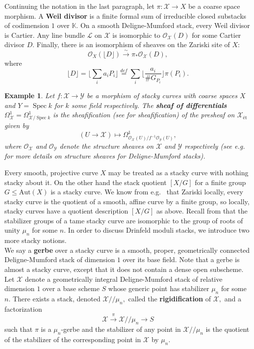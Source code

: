 \documentclass[11pt]{amsart}
\newtheorem{example}[theorem]{Example}
\theoremstyle{definition}
\numberwithin{equation}{section}
\newcommand{\Aut}{\mathrm{Aut}} 	%
\newcommand{\Spec}{\operatorname{Spec}} 	%
\newcommand{\cO}{\mathcal{O}}		%
\newcommand{\sL}{\mathscr{L}}		%
\newcommand{\sX}{\mathscr{X}}		%
\newcommand{\sY}{\mathscr{Y}}		%
\newcommand{\bbK}{\mathbb{K}}		%
\begin{document}
		Continuing the notation in the last paragraph, let $\pi:\sX\to X$ be a coarse space morphism. A \textbf{Weil divisor} is a finite formal sum of irreducible closed substacks of codimension $1$ over $\bbK.$ On a smooth Deligne-Mumford stack, every Weil divisor is Cartier. Any line bundle $\sL$ on $\sX$ is isomorphic to $\cO_{\sX}(D)$ for some Cartier divisor $D.$ Finally, there is an isomorphism of sheaves on the Zariski site of $X:$
		\[ \cO_X(\lfloor D \rfloor)\overset{\sim}{\to}\pi_*\cO_{\sX}(D), \]
		where \[\lfloor D\rfloor=\Big\lfloor\sum_ia_iP_i\Big\rfloor\overset{def}{=}\sum_i\Big\lfloor\frac{a_i}{\#G_{P_i}}\Big\rfloor\pi(P_i).\]
		
		\begin{example}\label{ex: sheaf of differentials}
			Let $f:\sX\to \sY$ be a morphism of stacky curves with coarse spaces $X$ and $Y=\Spec k$ for $k$ some field respectively. The \textbf{sheaf of differentials} $\Omega^1_{\sX}=\Omega^1_{\sX/\Spec k}$ is the sheafification (see \cite[Section $2.2.9$]{Alper-Stacks-and-Moduli} for sheafification) of the presheaf on $\sX_{\text{\'et}}$ given by 
			\[ (U\to \sX)\mapsto \Omega^1_{\cO_{\sX}(U)/f^{-1}\cO_{\sY}(U)},\]
			where $\cO_{\sX}$ and $\cO_{\sY}$ denote the structure sheaves on $\sX$ and $\sY$ respectively (see e.g.\ \cite[Example $4.1.2$]{Alper-Stacks-and-Moduli} for more details on structure sheaves for Deligne-Mumford stacks). 
		\end{example}
		
		Every smooth, projective curve $X$ may be treated as a stacky curve with nothing stacky about it. On the other hand the stack quotient $[X/G]$ for a finite group $G\leq \Aut(X)$ is a stacky curve. We know from e.g.\ \cite[Remark $5.2.8$]{VZB} that Zariski locally, every stacky curve is the quotient of a smooth, affine curve by a finite group, so locally, stacky curves have a quotient description $[X/G]$ as above. Recall from \cite[Lemma $5.3.10.(b)$]{VZB} that the stabilizer groups of a tame stacky curve are isomorphic to the group of roots of unity $\mu_n$ for some $n.$ In order to discuss Drinfeld moduli stacks, we introduce two more stacky notions.\\
		
		We say a \textbf{gerbe} over a stacky curve is a smooth, proper, geometrically connected Deligne-Mumford stack of dimension $1$ over its base field. Note that a gerbe is almost a stacky curve, except that it does not contain a dense open subscheme. Let $\sX$ denote a geometrically integral Deligne-Mumford stack of relative dimension $1$ over a base scheme $S$ whose generic point has stabilizer $\mu_n$ for some $n.$ There exists a stack, denoted $\sX/\!/\mu_n,$ called the \textbf{rigidification} of $\sX,$ and a factorization 
		\[\sX\overset{\pi}{\to}\sX/\!/\mu_n\to S\] 
		such that $\pi$ is a $\mu_n$-gerbe and the stabilizer of any point in $\sX/\!/\mu_n$ is the quotient of the stabilizer of the corresponding point in $\sX$ by $\mu_n.$
		
\end{document}
